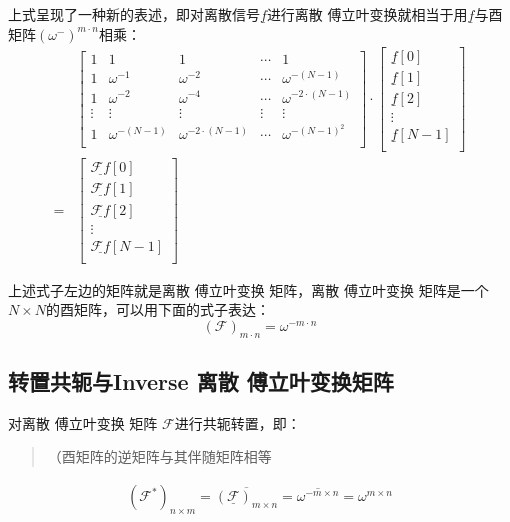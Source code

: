 上式呈现了一种新的表述，即对离散信号$\underline{f}$进行离散 傅立叶变换就相当于用$\underline{f}$与酉矩阵$(\omega^-)^{m\cdot n}$相乘：
\begin{align*}
	  & \left[
		\begin{matrix}
			1      & 1               & 1                     & \cdots & 1                     \\
			1      & \omega^{-1}     & \omega^{-2}           & \cdots & \omega^{-(N-1)}       \\
			1      & \omega^{-2}     & \omega^{-4}           & \cdots & \omega^{-2\cdot(N-1)} \\
			\vdots & \vdots          & \vdots                & \vdots & \vdots                \\
			1      & \omega^{-(N-1)} & \omega^{-2\cdot(N-1)} & \cdots & \omega^{-(N-1)^2}     \\
		\end{matrix}
		\right]
	\cdot
	\left[
		\begin{matrix}
			\underline{f}[0]   \\
			\underline{f}[1]   \\
			\underline{f}[2]   \\
			\vdots             \\
			\underline{f}[N-1] \\
		\end{matrix}
		\right]    \\
	= & \left[
		\begin{matrix}
			\underline{\mathcal{F}f}[0]   \\
			\underline{\mathcal{F}f}[1]   \\
			\underline{\mathcal{F}f}[2]   \\
			\vdots                        \\
			\underline{\mathcal{F}f}[N-1] \\
		\end{matrix}
		\right]
\end{align*}

上述式子左边的矩阵就是离散 傅立叶变换 矩阵，离散 傅立叶变换 矩阵是一个$N\times N$的酉矩阵，可以用下面的式子表达：
\begin{equation}
	(\mathcal{F})_{m\cdot n}=\omega^{-m\cdot n}
\end{equation}
\subsection{转置共轭与Inverse 离散 傅立叶变换矩阵}
对离散 傅立叶变换 矩阵  $\mathcal{F}$进行共轭转置，即：
\begin{quote}
	（酉矩阵的逆矩阵与其伴随矩阵相等
\end{quote}
\begin{align*}
	(\mathcal{F}^{*})_{n\times m} = \overline{(\underline{\mathcal{F}})_{m\times n}} = \overline{\omega^{-m\times n}} = \omega^{m\times n}
\end{align*}

